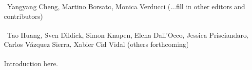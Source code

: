 

~Yangyang Cheng, Martino Borsato, Monica Verducci (...fill in other editors and contributors)\\
\text{ \; }\\
~Tao Huang, Sven Dildick, Simon Knapen, Elena Dall'Occo, Jessica Prisciandaro, Carlos V\'azquez Sierra, Xabier Cid Vidal (others forthcoming)\\
\text{ \; }\\

\noindent Introduction here.





